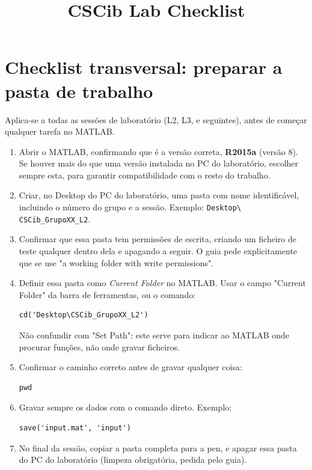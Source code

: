 \documentclass[a4paper,11pt]{article}
\title{CSCib Lab Checklist}
\author{}
\date{}
\begin{document}
\maketitle

\section*{Checklist transversal: preparar a pasta de trabalho}

Aplica-se a todas as sessões de laboratório (L2, L3, e seguintes), antes de começar
qualquer tarefa no MATLAB.

\begin{enumerate}[label=$\square$, leftmargin=1.5em]
  \item Abrir o MATLAB, confirmando que é a versão correta, \textbf{R2015a} (versão 8).
  Se houver mais do que uma versão instalada no PC do laboratório, escolher sempre
  esta, para garantir compatibilidade com o resto do trabalho.

  \item Criar, no Desktop do PC do laboratório, uma pasta com nome identificável,
  incluindo o número do grupo e a sessão. Exemplo: \texttt{Desktop\textbackslash
  CSCib\_GrupoXX\_L2}.

  \item Confirmar que essa pasta tem permissões de escrita, criando um ficheiro de
  teste qualquer dentro dela e apagando a seguir. O guia pede explicitamente que se
  use "a working folder with write permissions".

  \item Definir essa pasta como \emph{Current Folder} no MATLAB. Usar o campo
  "Current Folder" da barra de ferramentas, ou o comando:
  \begin{verbatim}
cd('Desktop\CSCib_GrupoXX_L2')
  \end{verbatim}
  Não confundir com "Set Path": este serve para indicar ao MATLAB onde procurar
  funções, não onde gravar ficheiros.

  \item Confirmar o caminho correto antes de gravar qualquer coisa:
  \begin{verbatim}
pwd
  \end{verbatim}

  \item Gravar sempre os dados com o comando direto. Exemplo:
  \begin{verbatim}
save('input.mat', 'input')
  \end{verbatim}

  \item No final da sessão, copiar a pasta completa para a pen, e apagar essa pasta
  do PC do laboratório (limpeza obrigatória, pedida pelo guia).
\end{enumerate}
\end{document}

